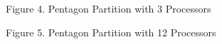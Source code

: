 \documentclass[11pt, oneside]{article}   	%
\begin{document}
\vspace{2mm}

\centerline {}
\centerline{Figure 4. Pentagon Partition with 3 Processors}

\vspace{2mm}

\centerline {}
\centerline{Figure 5. Pentagon Partition with 12 Processors}
\end{document}
